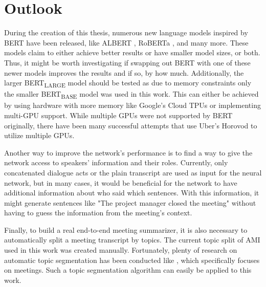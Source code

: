 \chapter{Outlook}\label{ch:outlook}

During the creation of this thesis, numerous new language models inspired by BERT have been released, like ALBERT \cite{1909.11942}, RoBERTa \cite{1907.11692}, and many more.
These models claim to either achieve better results or have smaller model sizes, or both.
Thus, it might be worth investigating if swapping out BERT with one of these newer models improves the results and if so, by how much.
Additionally, the larger BERT\textsubscript{LARGE} model should be tested as due to memory constraints only the smaller BERT\textsubscript{BASE} model was used in this work.
This can either be achieved by using hardware with more memory like Google's Cloud TPUs or implementing multi-GPU support.
While multiple GPUs were not supported by BERT originally, there have been many successful attempts that use Uber's Horovod \cite{sergeev2018horovod} to utilize multiple GPUs.

Another way to improve the network's performance is to find a way to give the network access to speakers' information and their roles.
Currently, only concatenated dialogue acts or the plain transcript are used as input for the neural network, but in many cases, it would be beneficial for the network to have additional information about who said which sentences.
With this information, it might generate sentences like "The project manager closed the meeting" without having to guess the information from the meeting's context.

Finally, to build a real end-to-end meeting summarizer, it is also necessary to automatically split a meeting transcript by topics.
The current topic split of AMI used in this work was created manually.
Fortunately, plenty of research on automatic topic segmentation has been conducted like \cite{10.3115/1075096.1075167}, which specifically focuses on meetings.
Such a topic segmentation algorithm can easily be applied to this work.